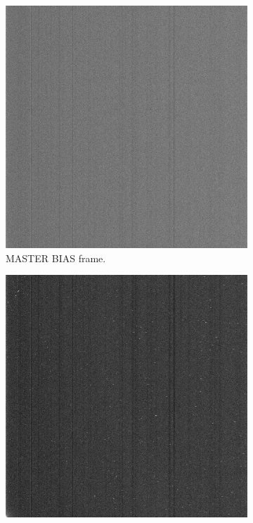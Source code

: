    
   
    \begin{figure}[!h]
    \centering
        \begin{subfigure}[t]{.3\textwidth}
            \centering
            \includegraphics[width=\textwidth]{images/biasframe.jpg}
            \caption{MASTER BIAS frame.}
            \label{fig:biasframe}
        \end{subfigure}
        \hfill
        \begin{subfigure}[t]{.3\textwidth}
            \centering
            \includegraphics[width=\textwidth]{images/dark90s.jpg}

\end{subfigure}
\end{figure}
